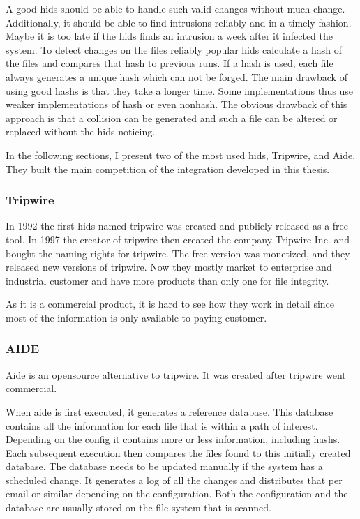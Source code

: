 A good \gls{hids} should be able to handle such valid changes without much change. Additionally, it should be able to find intrusions reliably and in a timely fashion. Maybe it is too late if the \gls{hids} finds an intrusion a week after it infected the system. To detect changes on the files reliably popular \gls{hids} calculate a hash of the files and compares that hash to previous runs. If a \gls{hash} is used, each file always generates a unique hash which can not be forged. The main drawback of using good \glspl{hash} is that they take a longer time. Some implementations thus use weaker implementations of \gls{hash} or even \gls{nonhash}. The obvious drawback of this approach is that a collision can be generated and such a file can be altered or replaced without the \gls{hids} noticing.

In the following sections, I present two of the most used \gls{hids}, Tripwire, and Aide. They built the main competition of the integration developed in this thesis.

\subsubsection{Tripwire}
\label{sec:tripwire}

In 1992 the first \gls{hids} named tripwire was created and publicly released as a free tool. In 1997 the creator of tripwire then created the company Tripwire Inc. and bought the naming rights for tripwire. The free version was monetized, and they released new versions of tripwire. \cite{Tripwire:Impl, Tripwire:company} Now they mostly market to enterprise and industrial customer and have more products than only one for file integrity. \cite{tripwire}

As it is a commercial product, it is hard to see how they work in detail since most of the information is only available to paying customer. 

\subsubsection{AIDE}
\label{sec:aide}

Aide is an \gls{opensource} alternative to tripwire. It was created after tripwire went commercial. \cite{aide:totherescue, aide:github}

When aide is first executed, it generates a reference database. This database contains all the information for each file that is within a path of interest. Depending on the config it contains more or less information, including \glspl{hash}. Each subsequent execution then compares the files found to this initially created database. The database needs to be updated manually if the system has a scheduled change. It generates a log of all the changes and distributes that per email or similar depending on the configuration. Both the configuration and the database are usually stored on the file system that is scanned. \cite{aide, aide:doc}

